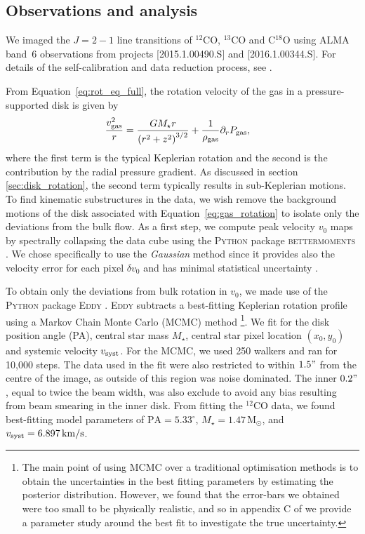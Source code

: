\subsection{Observations and analysis} \label{sec:obs_analysis_garg}

We imaged the $J=2-1$ line transitions of $^{12}$CO, $^{13}$CO and C$^{18}$O using ALMA band~6 observations from projects [2015.1.00490.S] and [2016.1.00344.S].
For details of the self-calibration and data reduction process, see \citet{garg2022}.

From Equation~\eqref{eq:rot_eq_full}, the rotation velocity of the gas in a pressure-supported disk is given by 
\begin{align}
    \frac{v_{\rm gas}^2}{r} &= \frac{G M_\star r}{\left( r^2 + z^2  \right)^{3/2}} + \frac{1}{\rho_{\rm gas}} \partial_r P_{\rm gas}, \label{eq:gas_rotation}
\end{align}
where the first term is the typical Keplerian rotation and the second is the contribution by the radial pressure gradient.
As discussed in section \ref{sec:disk_rotation}, the second term typically results in sub-Keplerian motions.
To find kinematic substructures in the data, we wish remove the background motions of the disk associated with Equation~\eqref{eq:gas_rotation} to isolate only the deviations from the bulk flow.
As a first step, we compute peak velocity $v_0$ maps by spectrally collapsing the data cube using the \textsc{Python} package \textsc{bettermoments} \citep{teague2018a}.
We chose specifically to use the \textit{Gaussian} method since it provides also the velocity error for each pixel $\delta v_0$ and has minimal statistical uncertainty \citep{yu2021}.

To obtain only the deviations from bulk rotation in $v_0$, we made use of the \textsc{Python} package \textsc{Eddy} \citep{teague2019}.
\textsc{Eddy} subtracts a best-fitting Keplerian rotation profile using a Markov Chain Monte Carlo (MCMC) method \citep{foreman-mackey2013}\footnote{The main point of using MCMC over a traditional optimisation methods is to obtain the uncertainties in the best fitting parameters by estimating the posterior distribution. However, we found that the error-bars we obtained were too small to be physically realistic, and so in appendix C of \citet{garg2022} we provide a parameter study around the best fit to investigate the true uncertainty.}.
We fit for the disk position angle (PA), central star mass $M_\star$, central star pixel location $(x_0,y_0)$ and systemic velocity $v_{\rm syst}$.
For the MCMC, we used 250 walkers and ran for 10,000 steps.
The data used in the fit were also restricted to within $1.5"$ from the centre of the image, as outside of this region was noise dominated.
The inner $0.2"$, equal to twice the beam width, was also exclude to avoid any bias resulting from beam smearing in the inner disk.
From fitting the $^{12}$CO data, we found best-fitting model parameters of $\mathrm{PA} = 5.33^\circ$, $M_\star = 1.47 \, \mathrm{M_\odot}$, and $v_{\rm syst} = 6.897 \, \mathrm{km/s}$.

